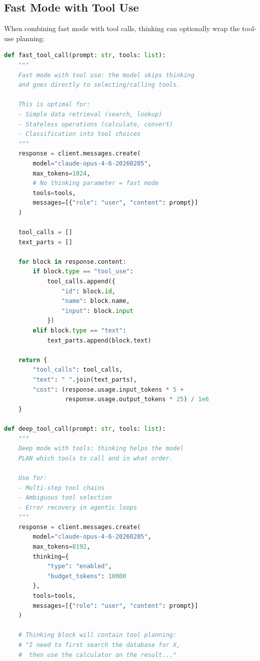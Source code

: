 \documentclass[11pt,a4paper]{article}
\begin{document}
\subsection{Fast Mode with Tool Use}

When combining fast mode with tool calls, thinking can optionally wrap the tool-use planning:

\begin{lstlisting}[language=Python, caption={Fast Mode with Tools: No Thinking Overhead}]
def fast_tool_call(prompt: str, tools: list):
    """
    Fast mode with tool use: the model skips thinking
    and goes directly to selecting/calling tools.
    
    This is optimal for:
    - Simple data retrieval (search, lookup)
    - Stateless operations (calculate, convert)
    - Classification into tool choices
    """
    response = client.messages.create(
        model="claude-opus-4-6-20260205",
        max_tokens=1024,
        # No thinking parameter = fast mode
        tools=tools,
        messages=[{"role": "user", "content": prompt}]
    )
    
    tool_calls = []
    text_parts = []
    
    for block in response.content:
        if block.type == "tool_use":
            tool_calls.append({
                "id": block.id,
                "name": block.name,
                "input": block.input
            })
        elif block.type == "text":
            text_parts.append(block.text)
    
    return {
        "tool_calls": tool_calls,
        "text": " ".join(text_parts),
        "cost": (response.usage.input_tokens * 5 +
                 response.usage.output_tokens * 25) / 1e6
    }

def deep_tool_call(prompt: str, tools: list):
    """
    Deep mode with tools: thinking helps the model 
    PLAN which tools to call and in what order.
    
    Use for:
    - Multi-step tool chains
    - Ambiguous tool selection
    - Error recovery in agentic loops
    """
    response = client.messages.create(
        model="claude-opus-4-6-20260205",
        max_tokens=8192,
        thinking={
            "type": "enabled",
            "budget_tokens": 10000
        },
        tools=tools,
        messages=[{"role": "user", "content": prompt}]
    )
    
    # Thinking block will contain tool planning:
    # "I need to first search the database for X,
    #  then use the calculator on the result..."
    

\end{lstlisting}
\end{document}
